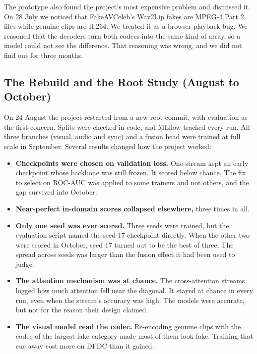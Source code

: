 The prototype also found the project's most expensive problem and dismissed
it. On 28 July we noticed that FakeAVCeleb's Wav2Lip fakes are MPEG-4 Part 2
files while genuine clips are H.264. We treated it as a browser playback bug.
We reasoned that the decoders turn both codecs into the same kind of array, so
a model could not see the difference. That reasoning was wrong, and we did not
find out for three months.

\subsection{The Rebuild and the Root Study (August to October)}

On 24 August the project restarted from a new root commit, with evaluation as
the first concern. Splits were checked in code, and MLflow tracked every run.
All three branches (visual, audio and sync) and a fusion head were trained at
full scale in September. Several results changed how the project worked:

\begin{itemize}
    \item \textbf{Checkpoints were chosen on validation loss.} One stream kept
    an early checkpoint whose backbone was still frozen. It scored below
    chance. The fix to select on ROC-AUC was applied to some trainers and not
    others, and the gap survived into October.
    \item \textbf{Near-perfect in-domain scores collapsed elsewhere,} three
    times in all.
    \item \textbf{Only one seed was ever scored.} Three seeds were trained, but
    the evaluation script named the seed-17 checkpoint directly. When the other
    two were scored in October, seed 17 turned out to be the best of three. The
    spread across seeds was larger than the fusion effect it had been used to
    judge.
    \item \textbf{The attention mechanism was at chance.} The cross-attention
    streams logged how much attention fell near the diagonal. It stayed at
    chance in every run, even when the stream's accuracy was high. The models
    were accurate, but not for the reason their design claimed.
    \item \textbf{The visual model read the codec.} Re-encoding genuine clips
    with the codec of the largest fake category made most of them look fake.
    Training that cue away cost more on DFDC than it gained.
\end{itemize}

